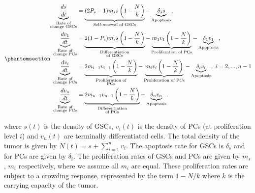 \documentclass[
  letterpaper,
]{scrreprt}
\theoremstyle{definition}
\theoremstyle{remark}
\begin{document}
\begin{equation}\phantomsection\label{eq-gsc-model}{
\begin{aligned}
  \underbrace{\frac{d s}{d t}}_{
    \substack{\text{Rate of} \\ \text{change GSCs}}} &=  \underbrace{(2P_s -1)  m_s s \left( 1 - \frac{N}{k}  \right)}_\text{Self-renewal of GSCs} - \underbrace{\delta_{s} s}_\text{Apoptosis}, \\
  \underbrace{\frac{d v_1}{d t}}_{
    \substack{\text{Rate of} \\ \text{change PCs}}} &= \underbrace{2(1- P_s)  m_s s \left( 1 - \frac{N}{k}  \right)}_{
    \substack{\text{Differentiation} \\ \text{of GSCs}}} - \underbrace{m_1 v_1 \left( 1 - \frac{N}{k} \right)}_\text{Proliferation of PCs} - \underbrace{\delta_{1} v_1}_\text{Apoptosis}, \\
  \underbrace{\frac{d v_i}{d t}}_{
    \substack{\text{Rate of} \\ \text{change PCs}}} &= \underbrace{2 m_{i-1} v_{i-1} \left( 1 - \frac{N}{k}  \right)}_{
    \substack{\text{Proliferation of} \\ \text{PCs}}} - \underbrace{m_i v_i \left( 1 - \frac{N}{k} \right)}_\text{Proliferation of PCs} - \underbrace{\delta_{i} v_i}_\text{Apoptosis}, \; i=2,...,n-1 \\
  \underbrace{\frac{d v_n}{d t}}_{
    \substack{\text{Rate of} \\ \text{change PCs}}} &= \underbrace{2 m_{n-1} v_{n-1} \left( 1 - \frac{N}{k}  \right)}_{
    \substack{\text{Differentiation} \\ \text{of PCs}}} - \underbrace{\delta_{n} v_n}_\text{Apoptosis}, \\
\end{aligned} 
}\end{equation}

where \(s(t)\) is the density of GSCs, \(v_i(t)\) is the density of PCs
(at proliferation level \(i\)) and \(v_n(t)\) are terminally
differentiated cells. The total density of the tumor is given by
\(N(t) = s + \sum_{i=1}^{n} v_i\). The apoptosis rate for GSCs is
\(\delta_s\) and for PCs are given by \(\delta_i\). The proliferation
rates of GSCs and PCs are given by \(m_s\), \(m_i\) respectively, where
we assume all \(m_i\) are equal. These proliferation rates are subject
to a crowding response, represented by the term \(1 - N/k\) where \(k\)
is the carrying capacity of the tumor.
\end{document}
